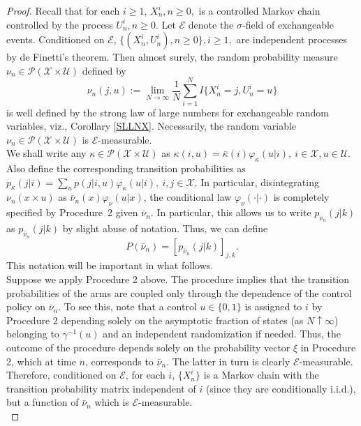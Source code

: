 \documentclass[12pt]{article}
\numberwithin{equation}{section}
\newcommand{\E}{\mathcal{E}}
\newcommand{\PA}{\mathcal{P}}
\newcommand{\1}{\textbf{1}}
\newcommand{\U}{\mathcal{U}}
\newcommand{\X}{\mathcal{X}}
\begin{document}
\begin{proof}
Recall that for each $i \geq 1$, $X^i_n, n \geq 0,$ is a controlled Markov chain controlled by the process $U^i_n, n \geq 0$.
Let $\E$ denote the $\sigma$-field of exchangeable events. Conditioned on $\E$,  $\{(X^i_n, U^i_n), n \geq 0\}, i \geq 1,$ are independent processes by de Finetti's theorem. Then almost surely,  the random probability measure $\nu_n \in \PA(\X\times\U)$ defined by
$$\nu_n(j,u) := \lim_{N\to\infty}\frac{1}{N}\sum_{i=1}^NI\{X^i_n=j, U^i_n = u\}$$
is well defined by the strong law of large numbers for exchangeable random variables, viz., Corollary \ref{SLLNX}. 
Necessarily, the random variable $\nu_n \in \PA(\X\times\U)$ is $\E$-measurable. \\

We shall write any $\kappa \in \PA(\X\times\U)$ as
$\kappa(i,u) = \bar{\kappa}(i)\varphi_\kappa(u|i) , \ i\in \X, u \in \U.$ Also define the corresponding transition probabilities as $p_\kappa(j|i) = \sum_up(j|i,u)\varphi_\kappa(u|i), \ i,j \in \X.$ In particular, disintegrating $\nu_n(x\times u)$ as $\bar{\nu}_n(x)\varphi_\nu(u|x)$, the conditional law $\varphi_\nu( \cdot | \cdot)$ is completely specified by Procedure~2 given $\bar{\nu}_n$. In particular, this allows us to write $p_{\nu_n}(j|k)$ as $p_{\bar{\nu}_n}(j|k)$ by slight abuse of notation. 
Thus, we can define
\begin{equation}
P(\bar\nu_n)= [p_{\bar\nu_n}(j|k)]_{j,k}. \label{newnotation}
\end{equation}
This notation will be important in what follows.\\

Suppose we apply Procedure 2 above. 
The procedure implies that the transition probabilities of the arms are coupled only through the dependence of the control policy on $\bar{\nu}_n$. To see this, note that a control $u \in \{0,1\}$ is assigned to $i$ by Procedure 2 depending solely on the asymptotic fraction of states (as $N\uparrow\infty$) belonging to $\gamma^{-1}(u)$ and an independent randomization if needed. Thus, the outcome of the procedure depends solely on the probability vector $\xi$ in Procedure 2, which at time $n$, corresponds to $\bar{\nu}_n$. The latter in turn is clearly $\E$-measurable. Therefore, conditioned on $\E$, for each $i$, $\{X^i_n\}$ is a Markov chain with the transition probability matrix independent of $i$ (since they are conditionally i.i.d.), but a function of $\bar{\nu}_n$ which is $\E$-measurable. \\


\end{proof}
\end{document}
